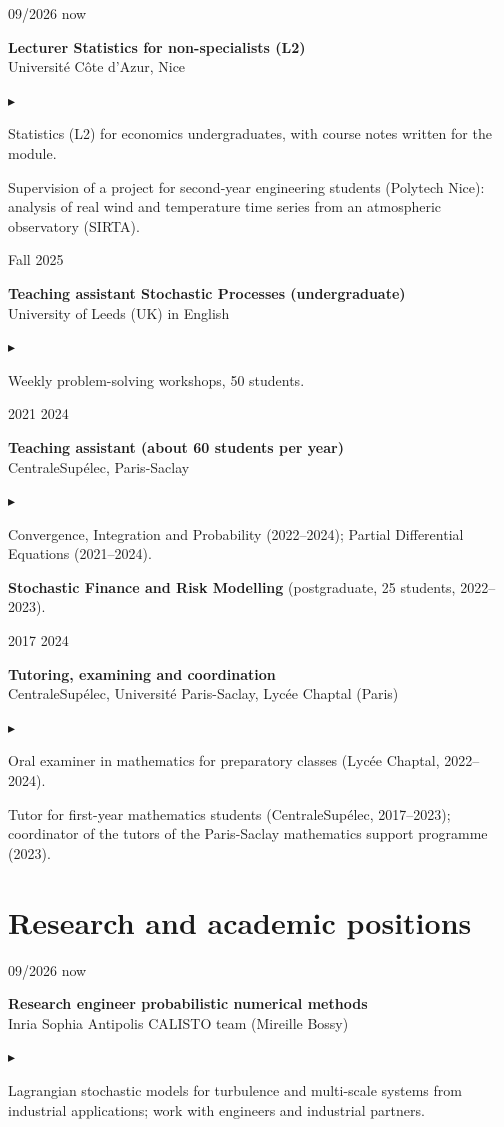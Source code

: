 \documentclass[10pt,a4paper]{article}
\newlength{\datecol}\setlength{\datecol}{0.155\textwidth}
\newlength{\gutter}\setlength{\gutter}{0.85em}
\newlength{\bodycol}
\newcommand{\entry}[3]{%
  \par\vspace{0.50ex}\noindent
  \begin{minipage}[t]{\datecol}
    \vspace{0pt}\raggedright\footnotesize\color{muted}#1
  \end{minipage}%
  \hspace{\gutter}%
  \begin{minipage}[t]{\bodycol}
    \vspace{0pt}\raggedright
    {\headingfont\bfseries\footnotesize #2}\\[0.08ex]
    {\footnotesize\color{accent}#3}
  \end{minipage}%
  \par\vspace{0.10ex}
}
\newenvironment{bullets}
  {\begin{list}{\textcolor{accent}{\scriptsize$\blacktriangleright$}}{%
      \setlength{\leftmargin}{\datecol}
      \addtolength{\leftmargin}{\gutter}
      \addtolength{\leftmargin}{1.15em}
      \setlength{\rightmargin}{0pt}
      \setlength{\labelwidth}{0.85em}
      \setlength{\labelsep}{0.3em}
      \setlength{\itemsep}{0.08ex}
      \setlength{\parsep}{0pt}
      \setlength{\topsep}{0.18ex}
      \setlength{\partopsep}{0pt}
      \footnotesize}}
  {\end{list}}
\begin{document}
\entry{09/2026 \textemdash{} now}{Lecturer \textemdash{} Statistics for non-specialists (L2)}{Université Côte d'Azur, Nice}
\begin{bullets}
  \item Statistics (L2) for economics undergraduates, with course notes written for the module.
  \item Supervision of a project for second-year engineering students (Polytech Nice): analysis of real wind
  and temperature time series from an atmospheric observatory (SIRTA).
\end{bullets}

\entry{Fall 2025}{Teaching assistant \textemdash{} Stochastic Processes (undergraduate)}{University of Leeds (UK) \textemdash{} in English}
\begin{bullets}
  \item Weekly problem-solving workshops, 50 students.
\end{bullets}

\entry{2021 \textemdash{} 2024}{Teaching assistant (about 60 students per year)}{CentraleSupélec, Paris-Saclay}
\begin{bullets}
  \item Convergence, Integration and Probability (2022--2024); Partial Differential Equations (2021--2024).
  \item \textbf{Stochastic Finance and Risk Modelling} (postgraduate, 25 students, 2022--2023).
\end{bullets}

\entry{2017 \textemdash{} 2024}{Tutoring, examining and coordination}{CentraleSupélec, Université Paris-Saclay, Lycée Chaptal (Paris)}
\begin{bullets}
  \item Oral examiner in mathematics for preparatory classes (Lycée Chaptal, 2022--2024).
  \item Tutor for first-year mathematics students (CentraleSupélec, 2017--2023); coordinator of the tutors of
  the Paris-Saclay mathematics support programme (2023).
\end{bullets}

\section{Research and academic positions}

\entry{09/2026 \textemdash{} now}{Research engineer \textemdash{} probabilistic numerical methods}{Inria Sophia Antipolis \textemdash{} CALISTO team (Mireille Bossy)}
\begin{bullets}
  \item Lagrangian stochastic models for turbulence and multi-scale systems from industrial applications;
  work with engineers and industrial partners.
\end{bullets}
\end{document}
